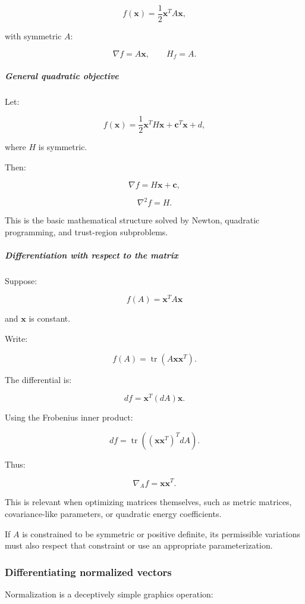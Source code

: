 \[
f(\mathbf x)=\frac12\mathbf x^TA\mathbf x,
\]

with symmetric \(A\):

\[
\boxed{ \nabla f=A\mathbf x, \qquad H_f=A }.
\]

\subparagraph{General quadratic objective}\label{general-quadratic-objective}

Let:

\[
f(\mathbf x)= \frac12\mathbf x^TH\mathbf x+ \mathbf c^T\mathbf x+d,
\]

where \(H\) is symmetric.

Then:

\[
\boxed{ \nabla f=H\mathbf x+\mathbf c },
\]

\[
\boxed{ \nabla^2f=H }.
\]

This is the basic mathematical structure solved by Newton, quadratic programming, and trust-region subproblems.

\subparagraph{Differentiation with respect to the matrix}\label{differentiation-with-respect-to-the-matrix}

Suppose:

\[
f(A)=\mathbf x^TA\mathbf x
\]

and \(\mathbf x\) is constant.

Write:

\[
f(A)=\operatorname{tr}(A\mathbf x\mathbf x^T).
\]

The differential is:

\[
df=\mathbf x^T(dA)\mathbf x.
\]

Using the Frobenius inner product:

\[
df= \operatorname{tr}((\mathbf x\mathbf x^T)^TdA).
\]

Thus:

\[
\boxed{ \nabla_Af=\mathbf x\mathbf x^T }.
\]

This is relevant when optimizing matrices themselves, such as metric matrices, covariance-like parameters, or quadratic energy coefficients.

If \(A\) is constrained to be symmetric or positive definite, its permissible variations must also respect that constraint or use an appropriate parameterization.

\subsubsection{Differentiating normalized vectors}\label{differentiating-normalized-vectors}

Normalization is a deceptively simple graphics operation:

